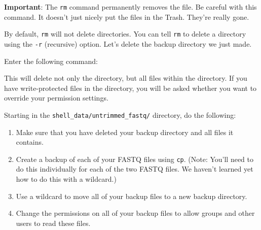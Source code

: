 \documentclass[
  letterpaper,
  DIV=11,
  numbers=noendperiod]{scrreprt}
\newenvironment{Shaded}{\begin{snugshade}}{\end{snugshade}}
\newcommand{\AttributeTok}[1]{\textcolor[rgb]{0.40,0.45,0.13}{#1}}
\newcommand{\ExtensionTok}[1]{\textcolor[rgb]{0.00,0.23,0.31}{#1}}
\newcommand{\NormalTok}[1]{\textcolor[rgb]{0.00,0.23,0.31}{#1}}
\providecommand{\tightlist}{%
  \setlength{\itemsep}{0pt}\setlength{\parskip}{0pt}}\usepackage{longtable,booktabs,array}
\begin{document}
\textbf{Important}: The \texttt{rm} command permanently removes the
file. Be careful with this command. It doesn't just nicely put the files
in the Trash. They're really gone.

By default, \texttt{rm} will not delete directories. You can tell
\texttt{rm} to delete a directory using the \texttt{-r} (recursive)
option. Let's delete the backup directory we just made.

Enter the following command:

\begin{Shaded}
\end{Shaded}

This will delete not only the directory, but all files within the
directory. If you have write-protected files in the directory, you will
be asked whether you want to override your permission settings.

\begin{tcolorbox}[enhanced jigsaw, opacitybacktitle=0.6, colback=white, coltitle=black, opacityback=0, rightrule=.15mm, toptitle=1mm, toprule=.15mm, bottomtitle=1mm, colframe=quarto-callout-caution-color-frame, arc=.35mm, titlerule=0mm, colbacktitle=quarto-callout-caution-color!10!white, leftrule=.75mm, title={Exercise}, breakable, bottomrule=.15mm, left=2mm]

Starting in the \texttt{shell\_data/untrimmed\_fastq/} directory, do the
following:

\begin{enumerate}
\def\labelenumi{\arabic{enumi}.}
\tightlist
\item
  Make sure that you have deleted your backup directory and all files it
  contains.
\item
  Create a backup of each of your FASTQ files using \texttt{cp}. (Note:
  You'll need to do this individually for each of the two FASTQ files.
  We haven't learned yet how to do this with a wildcard.)
\item
  Use a wildcard to move all of your backup files to a new backup
  directory.
\item
  Change the permissions on all of your backup files to allow groups and
  other users to read these files.
\end{enumerate}

\end{tcolorbox}
\end{document}
